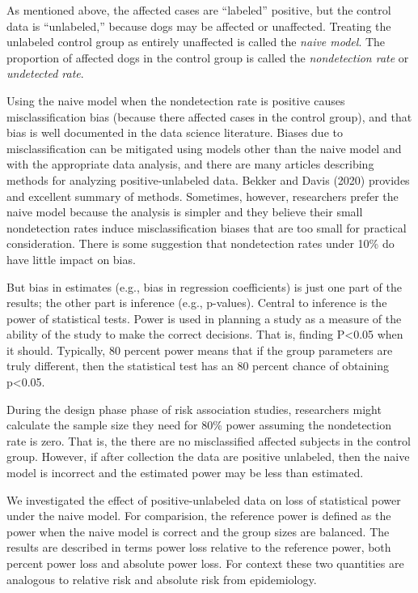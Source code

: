 \documentclass[
]{article}
\begin{document}
As mentioned above, the affected cases are ``labeled'' positive, but the
control data is ``unlabeled,'' because dogs may be affected or
unaffected. Treating the unlabeled control group as entirely unaffected
is called the \emph{naive model}. The proportion of affected dogs in the
control group is called the \emph{nondetection rate} or \emph{undetected
rate}.

Using the naive model when the nondetection rate is positive causes
misclassification bias (because there affected cases in the control
group), and that bias is well documented in the data science literature.
\cite{bd20} Biases due to misclassification can be mitigated using
models other than the naive model and with the appropriate data
analysis, and there are many articles describing methods for analyzing
positive-unlabeled data. Bekker and Davis (2020) provides and excellent
summary of methods. \cite{bd20} Sometimes, however, researchers prefer
the naive model because the analysis is simpler and they believe their
small nondetection rates induce misclassification biases that are too
small for practical consideration. There is some suggestion that
nondetection rates under 10\% do have little impact on bias. \cite{bd20}

But bias in estimates (e.g., bias in regression coefficients) is just
one part of the results; the other part is inference (e.g., p-values).
Central to inference is the power of statistical tests. Power is used in
planning a study as a measure of the ability of the study to make the
correct decisions. That is, finding P\textless0.05 when it should.
Typically, 80 percent power means that if the group parameters are truly
different, then the statistical test has an 80 percent chance of
obtaining p\textless0.05.

During the design phase phase of risk association studies, researchers
might calculate the sample size they need for 80\% power assuming the
nondetection rate is zero. That is, the there are no misclassified
affected subjects in the control group. However, if after collection the
data are positive unlabeled, then the naive model is incorrect and the
estimated power may be less than estimated.

We investigated the effect of positive-unlabeled data on loss of
statistical power under the naive model. For comparision, the reference
power is defined as the power when the naive model is correct and the
group sizes are balanced. The results are described in terms power loss
relative to the reference power, both percent power loss and absolute
power loss. For context these two quantities are analogous to relative
risk and absolute risk from epidemiology.
\end{document}
